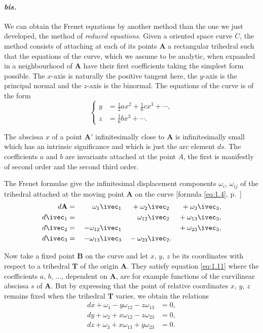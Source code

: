 \paragraph{\textnormal{\textit{bis.}}}
\label{sec:21a}
We can obtain the Frenet equations by another method than the one we just developed, the method of \emph{reduced equations}. Given a oriented space curve $C$, the method consists of attaching at each of its points $\mathbf{A}$ a rectangular trihedral such that the equations of the curve, which we assume to be analytic, when expanded in a neighbourhood of $\mathbf{A}$ have their first coefficients taking the simplest form possible. The $x$-axis is naturally the positive tangent here, the $y$-axis is the principal normal and the $z$-axis is the binormal. The equations of the curve is of the form
\begin{equation}
  \label{eq:1.11}
  \left\{
    \begin{aligned}      
      y&=\frac{1}{2}ax^{2}+\frac{1}{6}cx^{3}+\cdots,\\
      z&=\frac{1}{6}bx^{3}+\cdots.
    \end{aligned}      
  \right.
\end{equation}

The abscissa $x$ of a point $\mathbf{A}'$ infinitesimally close to $\mathbf{A}$ is infinitesimally small which has an intrinsic significance and which is just the arc element $ds$. The coefficients $a$ and $b$ are invariants attached at the point $A$, the first is manifestly of second order and the second third order.

The Frenet formulae give the infinitesimal displacement components $\omega_{i}$, $\omega_{ij}$ of the trihedral attached at the moving point $\mathbf{A}$ on the curve [formula \eqref{eq:1.4}, p.~\pageref{eq:1.4}]
\begin{alignat*}{4}
  d\mathbf{A}&={}&{}\omega_{1}\ivec_{1}&&{}+{}\omega_{2}\ivec_{2}&&{}+{}\omega_{3}\ivec_{3},\\
  d\ivec_{1}&=&&&\omega_{12}\ivec_{2}&&{}+{}\omega_{13}\ivec_{3},\\
  d\ivec_{2}&=&-\omega_{12}\ivec_{1}&&&&{}+{}\omega_{23}\ivec_{3},\\
  d\ivec_{3}&=&-\omega_{13}\ivec_{3}&&{}-{}\omega_{23}\ivec_{2}&.&
\end{alignat*}

Now take a fixed point $\mathbf{B}$ on the curve and let $x$, $y$, $z$ be its coordinates with respect to a trihedral $\mathbf{T}$ of the origin $\mathbf{A}$. They satisfy equation \eqref{eq:1.11} where the coefficients $a$, $b$, $\dots$, dependent on $\mathbf{A}$, are for example functions of the curvilinear abscissa $s$ of $\mathbf{A}$. But by expressing that the point of relative coordinates $x$, $y$, $z$ remains fixed when the trihedral $\mathbf{T}$ varies, we obtain the relations
\begin{align*}
  dx+\omega_{1}-y\omega_{12}-z\omega_{13}&=0,\\
  dy+\omega_{2}+x\omega_{12}-z\omega_{23}&=0,\\
  dz+\omega_{3}+x\omega_{13}+y\omega_{23}&=0.
\end{align*}

